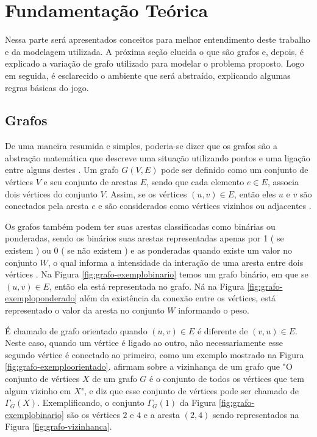 \chapter{Fundamentação Teórica}
\label{chap:fundteorica}
Nessa parte será apresentados conceitos para melhor entendimento deste trabalho e da modelagem utilizada. 
A próxima seção elucida o que são grafos e, depois, é explicado a variação de grafo utilizado para modelar o problema proposto. Logo em seguida, é esclarecido o ambiente que será abstraído, explicando algumas regras básicas do jogo.
\section{Grafos}
\label{chap:grafos}

De uma maneira resumida e simples, poderia-se dizer que os grafos são a abstração matemática que descreve uma situação utilizando pontos e uma ligação entre alguns destes \cite{Lucchesi1979}.
Um grafo \(G(V, E)\) pode ser definido como um conjunto de vértices \(V\) e seu conjunto de arestas \(E\), sendo que cada elemento \(e \in E\), associa dois vértices do conjunto \(V\). Assim, se os vértices \((u,v) \in E\), então eles \(u\) e \(v\) são conectados pela aresta \(e\) e são considerados como vértices vizinhos ou adjacentes \cite{grafosucinto, Viana2007}.

Os grafos também podem ter suas arestas classificadas como binárias ou ponderadas, sendo os binários suas arestas representadas apenas por 1 ( se existem ) ou 0 ( se não existem ) e as ponderadas quando existe um valor no conjunto \(W\), o qual informa a intensidade da interação de uma aresta entre dois vértices  \cite{Viana2007, cormen6}.
Na Figura \ref{fig:grafo-exemplobinario} temos um grafo binário,  em que se \((u,v) \in E\), então ela está representada no grafo. Ná na Figura \ref{fig:grafo-exemploponderado} além da existência da conexão entre os vértices, está representado o valor da aresta no conjunto \(W\) informando o peso. 

É chamado de grafo orientado quando \((u,v) \in E\) é diferente de \((v,u) \in E\). Neste caso, quando um vértice é ligado ao outro, não necessariamente esse segundo vértice é conectado ao primeiro, como um exemplo mostrado na Figura \ref{fig:grafo-exemploorientado}.
\citet{grafosucinto} afirmam sobre a vizinhança de um grafo que "O conjunto de vértices \(X\) de um grafo \(G\) é o conjunto de todos os vértices que tem algum vizinho em \(X\)", e diz que esse conjunto de vértices pode ser chamado de \(\Gamma_G(X)\). Exemplificando, o conjunto \(\Gamma_G(1)\) da Figura \ref{fig:grafo-exemplobinario} são os vértices \(2\) e \(4\) e a aresta \( (2,4) \) sendo representados na Figura \ref{fig:grafo-vizinhanca}.

